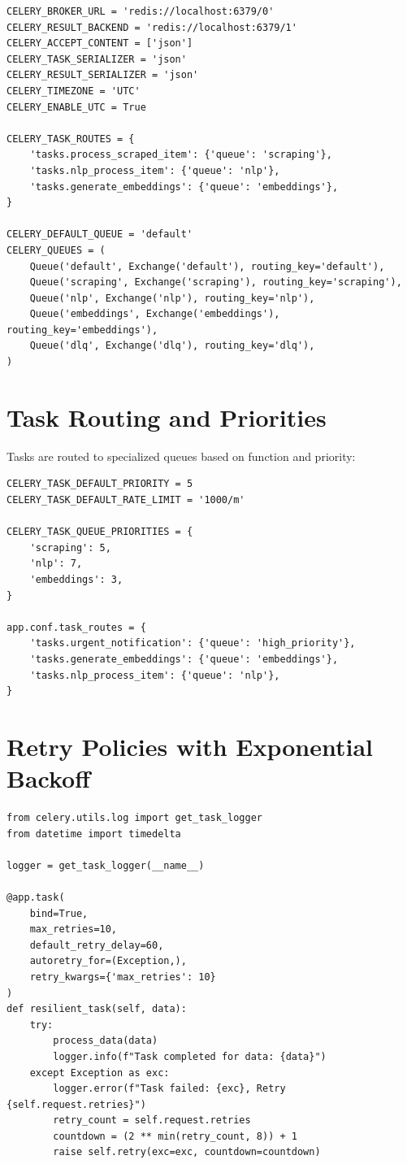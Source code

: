 \documentclass[12pt,a4paper]{report}
\begin{document}
\begin{lstlisting}
CELERY_BROKER_URL = 'redis://localhost:6379/0'
CELERY_RESULT_BACKEND = 'redis://localhost:6379/1'
CELERY_ACCEPT_CONTENT = ['json']
CELERY_TASK_SERIALIZER = 'json'
CELERY_RESULT_SERIALIZER = 'json'
CELERY_TIMEZONE = 'UTC'
CELERY_ENABLE_UTC = True

CELERY_TASK_ROUTES = {
    'tasks.process_scraped_item': {'queue': 'scraping'},
    'tasks.nlp_process_item': {'queue': 'nlp'},
    'tasks.generate_embeddings': {'queue': 'embeddings'},
}

CELERY_DEFAULT_QUEUE = 'default'
CELERY_QUEUES = (
    Queue('default', Exchange('default'), routing_key='default'),
    Queue('scraping', Exchange('scraping'), routing_key='scraping'),
    Queue('nlp', Exchange('nlp'), routing_key='nlp'),
    Queue('embeddings', Exchange('embeddings'), routing_key='embeddings'),
    Queue('dlq', Exchange('dlq'), routing_key='dlq'),
)
\end{lstlisting}

\section{Task Routing and Priorities}

Tasks are routed to specialized queues based on function and priority:

\begin{lstlisting}
CELERY_TASK_DEFAULT_PRIORITY = 5
CELERY_TASK_DEFAULT_RATE_LIMIT = '1000/m'

CELERY_TASK_QUEUE_PRIORITIES = {
    'scraping': 5,
    'nlp': 7,
    'embeddings': 3,
}

app.conf.task_routes = {
    'tasks.urgent_notification': {'queue': 'high_priority'},
    'tasks.generate_embeddings': {'queue': 'embeddings'},
    'tasks.nlp_process_item': {'queue': 'nlp'},
}
\end{lstlisting}

\section{Retry Policies with Exponential Backoff}

\begin{lstlisting}
from celery.utils.log import get_task_logger
from datetime import timedelta

logger = get_task_logger(__name__)

@app.task(
    bind=True,
    max_retries=10,
    default_retry_delay=60,
    autoretry_for=(Exception,),
    retry_kwargs={'max_retries': 10}
)
def resilient_task(self, data):
    try:
        process_data(data)
        logger.info(f"Task completed for data: {data}")
    except Exception as exc:
        logger.error(f"Task failed: {exc}, Retry {self.request.retries}")
        retry_count = self.request.retries
        countdown = (2 ** min(retry_count, 8)) + 1
        raise self.retry(exc=exc, countdown=countdown)
\end{lstlisting}
\end{document}
